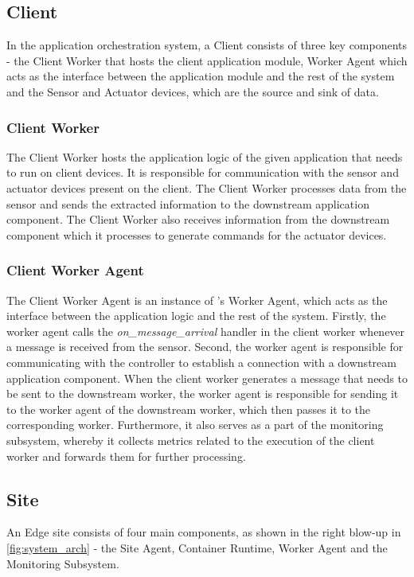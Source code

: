 \subsection{Client}
In the \oneeedge{} application orchestration system, a Client consists of three key components - the Client Worker that hosts the client application module, Worker Agent which acts as the interface between the application module and the rest of the system and the Sensor and Actuator devices, which are the source and sink of data.

\subsubsection{Client Worker}
The Client Worker hosts the application logic of the given application that needs to run on client devices. It is responsible for communication with the sensor and actuator devices present on the client. The Client Worker processes data from the sensor and sends the extracted information to the downstream application component. The Client Worker also receives information from the downstream component which it processes to generate commands for the actuator devices.

\subsubsection{Client Worker Agent}
The Client Worker Agent is an instance of \oneedge{}'s Worker Agent, which acts as the interface between the application logic and the rest of the system. Firstly, the worker agent calls the \textit{on\_message\_arrival} handler in the client worker whenever a message is received from the sensor. Second, the worker agent is responsible for communicating with the controller to establish a connection with a downstream application component. When the client worker generates a message that needs to be sent to the downstream worker, the worker agent is responsible for sending it to the worker agent of the downstream worker, which then passes it to the corresponding worker. Furthermore, it also serves as a part of the monitoring subsystem, whereby it collects metrics related to the execution of the client worker and forwards them for further processing.

\subsection{Site}
An Edge site consists of four main components, as shown in the right blow-up in \cref{fig:system_arch} - the Site Agent, Container Runtime, Worker Agent and the Monitoring Subsystem. 
